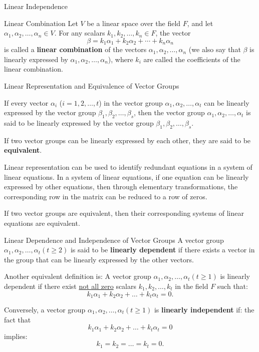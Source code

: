 \documentclass[11pt]{../../TexTemplate/elegantbook} %
\begin{document}
\begin{leftbarTitle}{Linear Independence}\end{leftbarTitle}
\begin{definition}{Linear Combination}
    Let \( V \) be a linear space over the field \( F \), 
    and let \( \alpha_1, \alpha_2, \ldots, \alpha_n \in V \).
    For any scalars \( k_1, k_2, \ldots, k_n \in F \), the vector
    \[
    \beta = k_1\alpha_1 + k_2\alpha_2 + \cdots + k_n\alpha_n
    \]
    is called a \textbf{linear combination} of the vectors \( \alpha_1, \alpha_2, \ldots, \alpha_n \)
    (we also say that \( \beta \) is linearly expressed by \( \alpha_1, \alpha_2, \ldots, \alpha_n \)),
    where \( k_i \) are called the coefficients of the linear combination.
\end{definition}

{Linear Representation and Equivalence of Vector Groups}

If every vector \( \alpha_i \) (\( i = 1, 2, \dots, t \)) in the vector group 
\( \alpha_1, \alpha_2, \dots, \alpha_t \) can be linearly expressed by the vector group 
\( \beta_1, \beta_2, \dots, \beta_s \), then the vector group 
\( \alpha_1, \alpha_2, \dots, \alpha_t \) is said to be linearly expressed by the vector group 
\( \beta_1, \beta_2, \dots, \beta_s \).

If two vector groups can be linearly expressed by each other, 
they are said to be \textbf{equivalent}.

\begin{remark}
    Linear representation can be used to identify redundant equations in a system of linear equations. 
    In a system of linear equations, if one equation can be linearly expressed by other equations, 
    then through elementary transformations, the corresponding row in the matrix can be reduced to a row of zeros.

    If two vector groups are equivalent, then their corresponding systems of linear equations are equivalent.
\end{remark}

\begin{definition}{Linear Dependence and Independence of Vector Groups}
    A vector group \( \alpha_1, \alpha_2, \dots, \alpha_t (t \geq 2) \) is said to be \textbf{linearly dependent} 
    if there exists a vector in the group that can be linearly expressed by the other vectors. 
    
    Another equivalent definition is:
    A vector group \( \alpha_1, \alpha_2, \dots, \alpha_t (t \geq 1) \) is linearly dependent 
    if there exist \underline{not all zero} scalars \( k_1, k_2, \dots, k_t \) in the field \( F \) such that:
    \[
    k_1 \alpha_1 + k_2 \alpha_2 + \dots + k_t \alpha_t = 0.
    \]

    Conversely, a vector group \( \alpha_1, \alpha_2, \dots, \alpha_t (t \geq 1) \) is \textbf{linearly independent} if:
    the fact that
    \[
    k_1 \alpha_1 + k_2 \alpha_2 + \dots + k_t \alpha_t = 0
    \]
    implies:
    \[
    k_1 = k_2 = \dots = k_t = 0.
    \]    
\end{definition}
\end{document}
